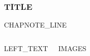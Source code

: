 %
%

\begin{frame}
  \frametitle{{{TITLE}}}
  {{CHAPNOTE_LINE}}
  \begin{columns}[T, onlytextwidth]
    \vskip0.15cm
    {{LEFT_TEXT}}

    \vskip0.05cm
    {{IMAGES}}
  \end{columns}
\end{frame}

%
